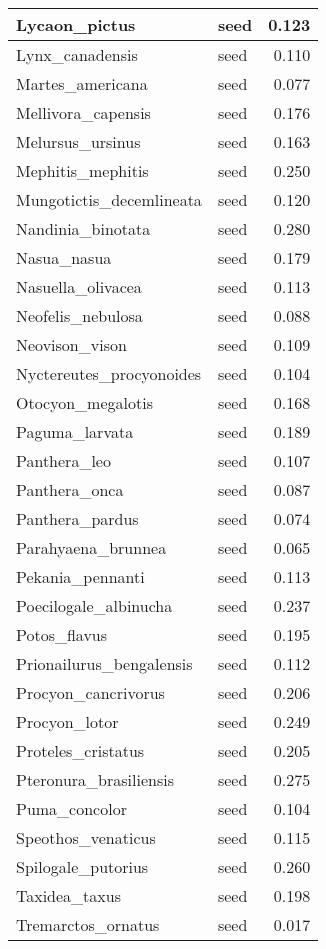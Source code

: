 \begin{table}
\begin{tabular}[t]{l|l|r}
\hline
Lycaon\_pictus & seed & 0.123\\
\hline
Lynx\_canadensis & seed & 0.110\\
\hline
Martes\_americana & seed & 0.077\\
\hline
Mellivora\_capensis & seed & 0.176\\
\hline
Melursus\_ursinus & seed & 0.163\\
\hline
Mephitis\_mephitis & seed & 0.250\\
\hline
Mungotictis\_decemlineata & seed & 0.120\\
\hline
Nandinia\_binotata & seed & 0.280\\
\hline
Nasua\_nasua & seed & 0.179\\
\hline
Nasuella\_olivacea & seed & 0.113\\
\hline
Neofelis\_nebulosa & seed & 0.088\\
\hline
Neovison\_vison & seed & 0.109\\
\hline
Nyctereutes\_procyonoides & seed & 0.104\\
\hline
Otocyon\_megalotis & seed & 0.168\\
\hline
Paguma\_larvata & seed & 0.189\\
\hline
Panthera\_leo & seed & 0.107\\
\hline
Panthera\_onca & seed & 0.087\\
\hline
Panthera\_pardus & seed & 0.074\\
\hline
Parahyaena\_brunnea & seed & 0.065\\
\hline
Pekania\_pennanti & seed & 0.113\\
\hline
Poecilogale\_albinucha & seed & 0.237\\
\hline
Potos\_flavus & seed & 0.195\\
\hline
Prionailurus\_bengalensis & seed & 0.112\\
\hline
Procyon\_cancrivorus & seed & 0.206\\
\hline
Procyon\_lotor & seed & 0.249\\
\hline
Proteles\_cristatus & seed & 0.205\\
\hline
Pteronura\_brasiliensis & seed & 0.275\\
\hline
Puma\_concolor & seed & 0.104\\
\hline
Speothos\_venaticus & seed & 0.115\\
\hline
Spilogale\_putorius & seed & 0.260\\
\hline
Taxidea\_taxus & seed & 0.198\\
\hline
Tremarctos\_ornatus & seed & 0.017\\

\end{tabular}
\end{table}
